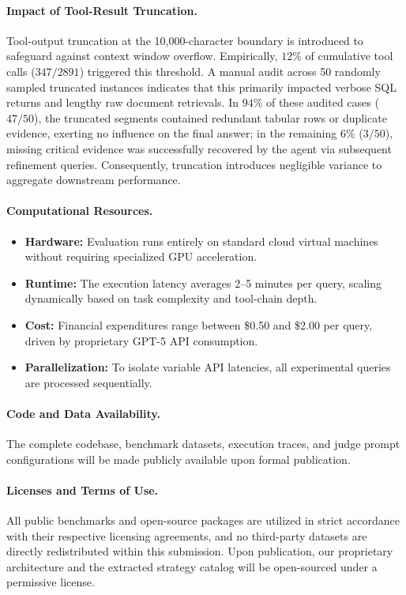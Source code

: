 \paragraph{Impact of Tool-Result Truncation.}
Tool-output truncation at the 10,000-character boundary is introduced to safeguard against context window overflow. Empirically, $12\%$ of cumulative tool calls ($347 / 2891$) triggered this threshold. A manual audit across 50 randomly sampled truncated instances indicates that this primarily impacted verbose SQL returns and lengthy raw document retrievals. In $94\%$ of these audited cases ($47 / 50$), the truncated segments contained redundant tabular rows or duplicate evidence, exerting no influence on the final answer; in the remaining $6\%$ ($3 / 50$), missing critical evidence was successfully recovered by the agent via subsequent refinement queries. Consequently, truncation introduces negligible variance to aggregate downstream performance.

\paragraph{Computational Resources.}
\begin{itemize}
  \item \textbf{Hardware:} Evaluation runs entirely on standard cloud virtual machines without requiring specialized GPU acceleration.
  \item \textbf{Runtime:} The execution latency averages 2--5 minutes per query, scaling dynamically based on task complexity and tool-chain depth.
  \item \textbf{Cost:} Financial expenditures range between \$0.50 and \$2.00 per query, driven by proprietary GPT-5 API consumption.
  \item \textbf{Parallelization:} To isolate variable API latencies, all experimental queries are processed sequentially.
\end{itemize}

\paragraph{Code and Data Availability.}
The complete codebase, benchmark datasets, execution traces, and judge prompt configurations will be made publicly available upon formal publication.

\paragraph{Licenses and Terms of Use.}
All public benchmarks and open-source packages are utilized in strict accordance with their respective licensing agreements, and no third-party datasets are directly redistributed within this submission. Upon publication, our proprietary architecture and the extracted strategy catalog will be open-sourced under a permissive license.

